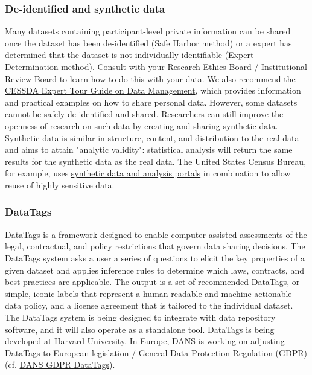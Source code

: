 \documentclass{article}
\begin{document}
\subsubsection{\textbf{De-identified and synthetic data}}\label{de-identified-and-synthetic-data}



Many datasets containing participant-level private information can be shared once the dataset has been de-identified (Safe Harbor method) or a expert has determined that the dataset is not individually identifiable (Expert Determination method). Consult with your Research Ethics Board / Institutional Review Board to learn how to do this with your data. We also recommend \href{https://www.cessda.eu/Research-Infrastructure/Training/Expert-tour-guide-on-Data-Management/5.-Protect/Ethics-and-data-protection}{the CESSDA Expert Tour Guide on Data Management}, which provides information and practical examples on how to share personal data. However, some datasets cannot be safely de-identified and shared. Researchers can still improve the openness of research on such data by creating and sharing synthetic data. Synthetic data is similar in structure, content, and distribution to the real data and aims to attain "analytic validity": statistical analysis will return the same results for the synthetic data as the real data. The United States Census Bureau, for example, uses \href{https://census.gov/content/dam/Census/programs-surveys/sipp/methodology/SSBdescribe_nontechnical.pdf}{synthetic data and analysis portals} in combination to allow reuse of highly sensitive data.


\subsubsection{\textbf{DataTags}}\label{datatags}



\href{https://datatags.org/}{DataTags} is a framework designed to enable computer-assisted assessments of the legal, contractual, and policy restrictions that govern data sharing decisions. The DataTags system asks a user a series of questions to elicit the key properties of a given dataset and applies inference rules to determine which laws, contracts, and best practices are applicable. The output is a set of recommended DataTags, or simple, iconic labels that represent a human-readable and machine-actionable data policy, and a license agreement that is tailored to the individual dataset. The DataTags system is being designed to integrate with data repository software, and it will also operate as a standalone tool. DataTags is being developed at Harvard University. In Europe, DANS is working on adjusting DataTags to European legislation / General Data Protection Regulation (\href{https://www.eugdpr.org/}{GDPR}) (cf. \href{https://zingtree.com/host.php?style=buttons&tree_id=442670046&persist_names=Restart&persist_node_ids=58#58}{DANS GDPR DataTags}).
\end{document}
